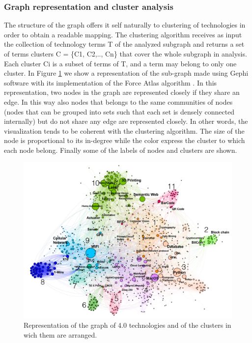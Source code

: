 \documentclass[]{book}
\theoremstyle{definition}
\theoremstyle{definition}
\theoremstyle{definition}
\theoremstyle{remark}
\begin{document}
\subsubsection*{Graph representation and cluster
analysis}\label{graph-representation-and-cluster-analysis}

The structure of the graph offers it self naturally to clustering of
technologies in order to obtain a readable mapping. The clustering
algorithm receives as input the collection of technology terms T of the
analyzed subgraph and returns a set of terms clusters C = \{C1, C2,..,
Cn\} that cover the whole subgraph in analysis. Each cluster Ci is a
subset of terms of T, and a term may belong to only one cluster. In
Figure \ref{fig:technimetro} we show a representation of the sub-graph
made using Gephi software with its implementation of the Force Atlas
algorithm \citep{ICWSM09154} . In this representation, two nodes in the
graph are represented closely if they share an edge. In this way also
nodes that belongs to the same communities of nodes (nodes that can be
grouped into sets such that each set is densely connected internally)
but do not share any edge are represented closely. In other words, the
visualization tends to be coherent with the clustering algorithm. The
size of the node is proportional to its in-degree while the color
express the cluster to which each node belong. Finally some of the
labels of nodes and clusters are shown.

\begin{figure}

{\centering \includegraphics[width=1\linewidth]{_bookdown_files/figures/Graph_Tech.001} 

}

\caption{ Representation of the graph of 4.0 technologies and of the clusters in wich them are arranged.}\label{fig:technimetro}
\end{figure}
\end{document}
